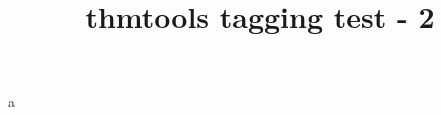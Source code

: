 \documentclass{article}
\title{thmtools tagging test - 2}
\begin{document}
\begin{theorem}
    a
\end{theorem}
\end{document}
